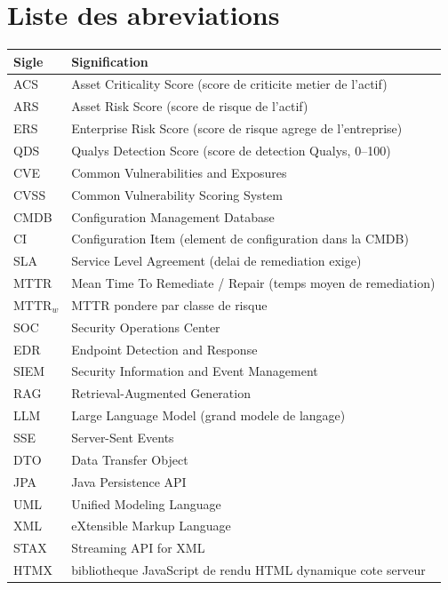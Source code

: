 \chapter*{Liste des abreviations}

\begin{longtable}{@{}p{3.5cm}p{11cm}@{}}
\toprule
\textbf{Sigle} & \textbf{Signification} \\
\midrule
\endhead
ACS & Asset Criticality Score (score de criticite metier de l'actif) \\
ARS & Asset Risk Score (score de risque de l'actif) \\
ERS & Enterprise Risk Score (score de risque agrege de l'entreprise) \\
QDS & Qualys Detection Score (score de detection Qualys, 0--100) \\
CVE & Common Vulnerabilities and Exposures \\
CVSS & Common Vulnerability Scoring System \\
CMDB & Configuration Management Database \\
CI & Configuration Item (element de configuration dans la CMDB) \\
SLA & Service Level Agreement (delai de remediation exige) \\
MTTR & Mean Time To Remediate / Repair (temps moyen de remediation) \\
$\mathrm{MTTR}_w$ & MTTR pondere par classe de risque \\
SOC & Security Operations Center \\
EDR & Endpoint Detection and Response \\
SIEM & Security Information and Event Management \\
RAG & Retrieval-Augmented Generation \\
LLM & Large Language Model (grand modele de langage) \\
SSE & Server-Sent Events \\
DTO & Data Transfer Object \\
JPA & Java Persistence API \\
UML & Unified Modeling Language \\
XML & eXtensible Markup Language \\
STAX & Streaming API for XML \\
HTMX & bibliotheque JavaScript de rendu HTML dynamique cote serveur \\
\bottomrule
\end{longtable}

\clearpage
